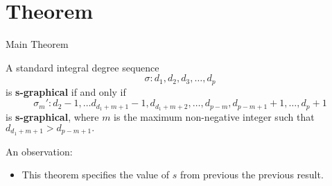 \section{Theorem}

\begin{frame}{Main Theorem}
	\begin{theorem}
		A standard integral degree sequence 
		\begin{equation}
			\sigma: d_1,d_2,d_3,\ldots, d_p
		\end{equation}
		is \textbf{s-graphical} if and only if 
		\begin{equation*}
			\sigma_m':d_2-1,\ldots d_{d_1+m+1}-1,d_{d_1+m+2},\ldots, d_{p-m},d_{p-m+1}+1,\ldots,d_p+1
		\end{equation*}
		is \textbf{s-graphical}, where $m$ is the maximum non-negative integer such that $d_{d_1+m+1}>d_{p-m+1}.$
	\end{theorem}
		An observation:
	\begin{itemize}
		\item This theorem specifies the value of $s$ from previous the previous result.
	\end{itemize}
\end{frame}
